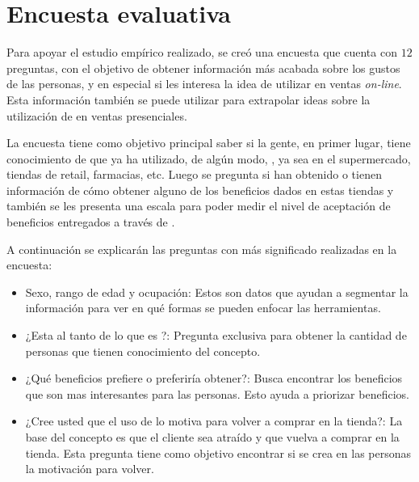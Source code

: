\section{Encuesta evaluativa}

Para apoyar el estudio empírico realizado, se creó una encuesta que cuenta con $12$ preguntas, con el
objetivo de obtener información más acabada sobre los gustos de las personas, y en especial
si les interesa la idea de utilizar {\gam} en ventas \emph{on-line}. Esta información
también se puede utilizar para extrapolar ideas sobre la utilización de {\gam} en
ventas presenciales.

La encuesta tiene como objetivo principal saber si la gente, en primer lugar, tiene conocimiento
de que ya ha utilizado, de algún modo, {\gam}, ya sea en el supermercado, tiendas de retail,
farmacias, etc. Luego se pregunta si han obtenido o tienen información de cómo obtener alguno
de los beneficios dados en estas tiendas y también se les presenta una escala para poder medir
el nivel de aceptación de beneficios entregados a través de {\gam}.

A continuación se explicarán las preguntas con más significado realizadas en la encuesta:
\begin{itemize}
\item Sexo, rango de edad y ocupación: Estos son datos que ayudan a segmentar
la información para ver en qué formas se pueden enfocar las herramientas.
\item ¿Esta al tanto de lo que es {\gam}?: Pregunta exclusiva para obtener la cantidad de
personas que tienen conocimiento del concepto.
\item ¿Qué beneficios prefiere o preferiría obtener?: Busca encontrar los beneficios que son
 mas interesantes para las personas. Esto ayuda a priorizar beneficios.
\item ¿Cree usted que el uso de {\gam} lo motiva para volver a comprar en la tienda?: La
base del concepto es que el cliente sea atraído y que vuelva a comprar en la tienda. Esta pregunta
tiene como objetivo encontrar si se crea en las personas la motivación para volver.
\end{itemize}

